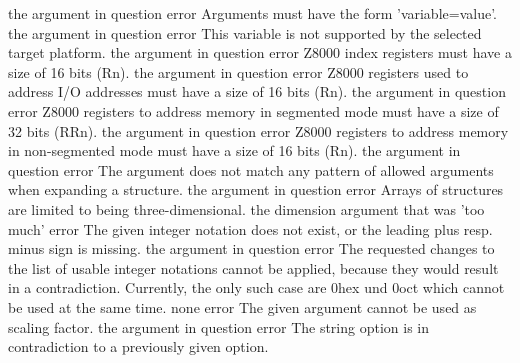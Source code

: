\documentclass[12pt,twoside]{report}
\begin{document}
\begin{description}
               {the argument in question}
               {error}
               {Arguments must have the form 'variable=value'.}
               {the argument in question}
               {error}
               {This variable is not supported by the selected target platform.}
               {the argument in question}
               {error}
               {Z8000 index registers must have a size of 16 bits (Rn).}
               {the argument in question}
               {error}
               {Z8000 registers used to address I/O addresses must have a size of 16 bits (Rn).}
               {the argument in question}
               {error}
               {Z8000 registers to address memory in segmented mode must have a size of 32 bits (RRn).}
               {the argument in question}
               {error}
               {Z8000 registers to address memory in non-segmented mode must have a size of 16 bits (Rn).}
               {the argument in question}
               {error}
               {The argument does not match any pattern of allowed arguments
                when expanding a structure.}
               {the argument in question}
               {error}
               {Arrays of structures are limited to being three-dimensional.}
               {the dimension argument that was 'too much'}
               {error}
               {The given integer notation does not exist, or the leading plus resp.
                minus sign is missing.}
               {the argument in question}
               {error}
               {The requested changes to the list of usable integer notations cannot
                be applied, because they would result in a contradiction.  Currently,
                the only such case are 0hex und 0oct which cannot be used at the same
                time.}
               {none}
               {error}
               {The given argument cannot be used as scaling factor.}
               {the argument in question}
               {error}
               {The string option is in contradiction to a previously given option.}

\end{description}
\end{document}

